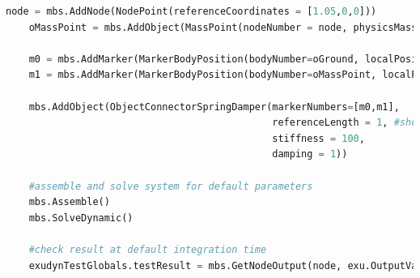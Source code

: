 \label{miniExample_ObjectConnectorSpringDamper}
\pythonstyle
\begin{lstlisting}[language=Python, firstnumber=1]
    node = mbs.AddNode(NodePoint(referenceCoordinates = [1.05,0,0]))
    oMassPoint = mbs.AddObject(MassPoint(nodeNumber = node, physicsMass=1))
    
    m0 = mbs.AddMarker(MarkerBodyPosition(bodyNumber=oGround, localPosition=[0,0,0]))
    m1 = mbs.AddMarker(MarkerBodyPosition(bodyNumber=oMassPoint, localPosition=[0,0,0]))
    
    mbs.AddObject(ObjectConnectorSpringDamper(markerNumbers=[m0,m1],
                                              referenceLength = 1, #shorter than initial distance
                                              stiffness = 100,
                                              damping = 1))

    #assemble and solve system for default parameters
    mbs.Assemble()
    mbs.SolveDynamic()

    #check result at default integration time
    exudynTestGlobals.testResult = mbs.GetNodeOutput(node, exu.OutputVariableType.Position)[0]
\end{lstlisting}

